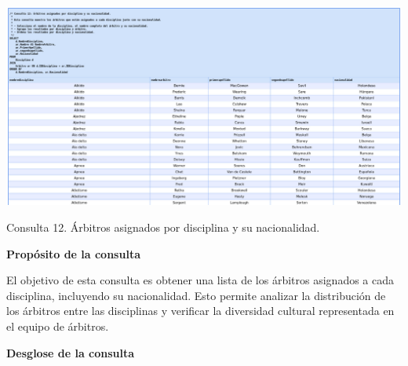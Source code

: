 \begin{center}
    \includegraphics[width=16.5cm]{resources/Consulta12.jpeg} 
    
   Consulta 12. Árbitros asignados por disciplina y su nacionalidad.
\end{center}

\textbf{Propósito de la consulta}

El objetivo de esta consulta es obtener una lista de los árbitros asignados a cada disciplina, incluyendo su nacionalidad. Esto permite analizar la distribución de los árbitros entre las disciplinas y verificar la diversidad cultural representada en el equipo de árbitros.

\textbf{Desglose de la consulta}

